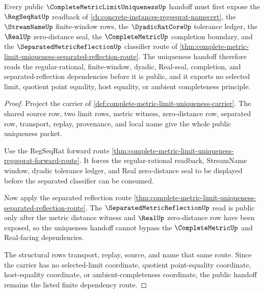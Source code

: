 \begin{theorem}
\label{thm:complete-metric-limit-uniqueness-regseqrat-real-separated-dependency-route}
Every public $\CompleteMetricLimitUniquenessUp$ handoff must first expose the $\RegSeqRatUp$ readback of \autoref{ch:concrete-instances-regseqrat-namecert}, the $\StreamNameUp$ finite-window rows, the $\DyadicRatCoreUp$ tolerance ledger, the $\RealUp$ zero-distance seal, the $\CompleteMetricUp$ completion boundary, and the $\SeparatedMetricReflectionUp$ classifier route of \autoref{thm:complete-metric-limit-uniqueness-separated-reflection-route}. The uniqueness handoff therefore reads the regular-rational, finite-window, dyadic, Real-seal, completion, and separated-reflection dependencies before it is public, and it exports no selected limit, quotient point equality, host equality, or ambient completeness principle.
\end{theorem}
\begin{proof}
Project the carrier of \autoref{def:complete-metric-limit-uniqueness-carrier}. The shared source row, two limit rows, metric witness, zero-distance row, separated row, transport, replay, provenance, and local name give the whole public uniqueness packet.

Use the RegSeqRat forward route \autoref{thm:complete-metric-limit-uniqueness-regseqrat-forward-route}. It forces the regular-rational readback, StreamName window, dyadic tolerance ledger, and Real zero-distance seal to be displayed before the separated classifier can be consumed.

Now apply the separated reflection route \autoref{thm:complete-metric-limit-uniqueness-separated-reflection-route}. The $\SeparatedMetricReflectionUp$ read is public only after the metric distance witness and $\RealUp$ zero-distance row have been exposed, so the uniqueness handoff cannot bypass the $\CompleteMetricUp$ and Real-facing dependencies.

The structural rows transport, replay, source, and name that same route. Since the carrier has no selected-limit coordinate, quotient point-equality coordinate, host-equality coordinate, or ambient-completeness coordinate, the public handoff remains the listed finite dependency route.
\end{proof}
